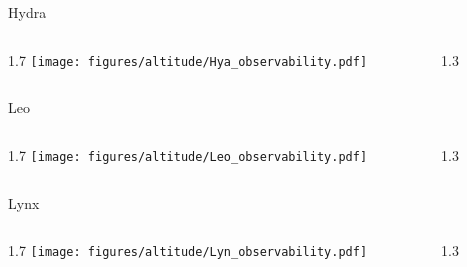 \documentclass[final]{beamer}
\newlength{\colwidth}
\begin{document}
\begin{frame}[t]{}

  \Large{Hydra}
  \begin{columns}[T]
    \begin{column}{1.7\colwidth}
      \centering
      \texttt{[image: figures/altitude/Hya\_observability.pdf]}
    \end{column}
    \begin{column}{1.3\colwidth}
      \Large
      
    \end{column}
  \end{columns}

  \Large{Leo}
  \begin{columns}[T]
    \begin{column}{1.7\colwidth}
      \centering
      \texttt{[image: figures/altitude/Leo\_observability.pdf]}
    \end{column}
    \begin{column}{1.3\colwidth}
      \Large
      
    \end{column}
  \end{columns}

  \Large{Lynx}
  \begin{columns}[T]
    \begin{column}{1.7\colwidth}
      \centering
      \texttt{[image: figures/altitude/Lyn\_observability.pdf]}
    \end{column}
    \begin{column}{1.3\colwidth}
      \Large
      
    \end{column}
  \end{columns}
\end{frame}

\end{document}
